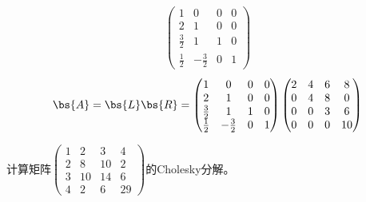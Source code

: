 \documentclass[12pt, a4paper, oneside, UTF8]{ctexbook}
\begin{document}
\begin{solution}
\begin{align*}
\begin{pmatrix}
                    1& 0 &0 &0\\
                    2&1&0&0\\
                    \frac{3}{2}&1&1&0\\
                    \frac{1}{2}&-\frac{3}{2}&0&1
                \end{pmatrix}
            \end{align*}
\begin{align*}
    \bs{A}=\bs{L}\bs{R}=\begin{pmatrix}
        1& 0 &0 &0\\
        2&1&0&0\\
        \frac{3}{2}&1&1&0\\
        \frac{1}{2}&-\frac{3}{2}&0&1
    \end{pmatrix}
    \begin{pmatrix}
        2&4&6&8\\
        0&4&8&0\\
        0&0&3&6\\
        0&0&0&10
    \end{pmatrix}
\end{align*}
\end{solution}

\begin{question}
    计算矩阵$\begin{pmatrix}
        1&2&3&4\\
        2&8&10&2\\
        3&10&14&6\\
        4&2&6&29
    \end{pmatrix}$的Cholesky分解。
\end{question}
\end{document}
